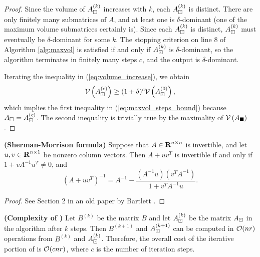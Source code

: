 \documentclass{article}
\begin{document}
\begin{proof}
	 	Since the volume of $A_\boxdot^{(k)}$ increases with $k$, each $A_\boxdot^{(k)}$ is distinct. There are only finitely many submatrices of $A$, and at least one is $\delta$-dominant (one of the maximum volume submatrices certainly is). Since each $A_\boxdot^{(k)}$ is distinct, $A_\boxdot^{(k)}$ must eventually be $\delta$-dominant for some $k$. The stopping criterion on line 8 of Algorithm \ref{alg:maxvol} is satisfied if and only if $A_\boxdot^{(k)}$ is $\delta$-dominant, so the algorithm terminates in finitely many steps $c$, and the output is $\delta$-dominant.
	 	
	 	Iterating the inequality in (\ref{eq:volume_increase}), we obtain
	 	\begin{equation}
	 		\mathcal{V}\left(A_\boxdot^{(c)}\right) \ge (1+\delta)^c\mathcal{V}\left(A_\boxdot^{(0)}\right),
	 	\end{equation}
	 	which implies the first inequality in (\ref{eq:maxvol_steps_bound}) because $A_\square = A_\boxdot^{(c)}$. The second inequality is trivially true by the maximality of $\mathcal{V}\left(A_\blacksquare\right)$.
	\end{proof}
	
	\begin{lem} \textnormal{\bf(Sherman-Morrison formula)}
		\label{lem:sherman_morrison}
		Suppose that $A \in \textnormal{\bf R}^{n\times n}$ is invertible, and let $u,v\in\textnormal{\bf R}^{n\times 1}$ be nonzero column vectors. Then $A + uv^T$ is invertible if and only if $1 + vA^{-1}u^T \ne 0$, and
		\begin{equation}
			\left(A+ uv^T\right)^{-1} = A^{-1} - \frac{\left(A^{-1}u\right)\left(v^TA^{-1}\right)}{1 + v^TA^{-1}u}.
		\end{equation}
	\end{lem}
	
	\begin{proof}
		See Section 2 in an old paper by Bartlett \cite{bartlett_1951}.
	\end{proof}
	
	\begin{thm} \textnormal{\bf(Complexity of \maxvol)}
		Let $B^{(k)}$ be the matrix $B$ and let $A_\boxdot^{(k)}$ be the matrix $A_\boxdot$ in the \maxvol{} algorithm after $k$ steps. Then $B^{(k+1)}$ and $A_\boxdot^{(k+1)}$ can be computed in $\mathcal{O}(nr)$ operations from $B^{(k)}$ and $A_\boxdot^{(k)}$. Therefore, the overall cost of the iterative portion of \maxvol{} is $\mathcal{O}(cnr)$, where $c$ is the number of iteration steps.
	\end{thm}
	
\end{document}
